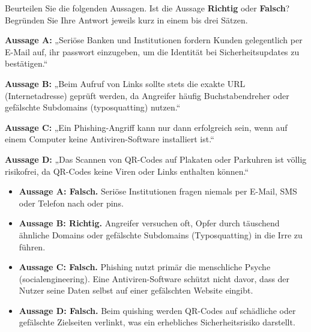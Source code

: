 \documentclass[12pt,a4paper]{article}
\newcounter{subsubsubsection}[subsubsection]
\begin{document}
\newpage


\begin{taskbox}
Beurteilen Sie die folgenden Aussagen. Ist die Aussage \textbf{Richtig} oder \textbf{Falsch}? \newline Begründen Sie Ihre Antwort jeweils kurz in einem bis drei Sätzen.

\textbf{Aussage A:} „Seriöse Banken und Institutionen fordern Kunden gelegentlich per E-Mail auf, ihr \gls{passwort} einzugeben, um die Identität bei Sicherheitsupdates zu bestätigen.“

\textbf{Aussage B:} „Beim Aufruf von Links sollte stets die exakte URL (Internetadresse) geprüft werden, da Angreifer häufig Buchstabendreher oder gefälschte Subdomains (\gls{typosquatting}) nutzen.“

\textbf{Aussage C:} „Ein Phishing-Angriff kann nur dann erfolgreich sein, wenn auf einem Computer keine Antiviren-Software installiert ist.“

\textbf{Aussage D:} „Das Scannen von QR-Codes auf Plakaten oder Parkuhren ist völlig risikofrei, da QR-Codes keine Viren oder Links enthalten können.“
\end{taskbox}

\begin{solutionbox}[Musterlösung 2.3.6.1]
\begin{itemize}
    \item \textbf{Aussage A: Falsch.} Seriöse Institutionen fragen niemals per E-Mail, SMS oder Telefon nach  oder \gls{pin}s.
    \item \textbf{Aussage B: Richtig.} Angreifer versuchen oft, Opfer durch täuschend \mbox{ähnliche} Domains oder gefälschte Subdomains (Typosquatting) in die Irre zu \mbox{führen.}
    \item \textbf{Aussage C: Falsch.} Phishing nutzt primär die menschliche Psyche (\gls{socialengineering}). Eine Antiviren-Software schützt nicht davor, dass der Nutzer seine Daten selbst auf einer gefälschten Website eingibt.
    \item \textbf{Aussage D: Falsch.} Beim \gls{quishing} werden QR-Codes auf schädliche oder gefälschte Zielseiten verlinkt, was ein erhebliches Sicherheitsrisiko darstellt.
\end{itemize}
\end{solutionbox}
\end{document}
